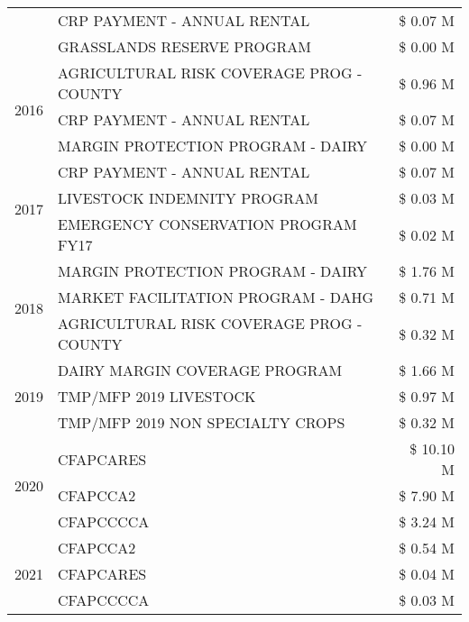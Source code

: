 \begin{tabular}{llr}
 & CRP PAYMENT - ANNUAL RENTAL & \$ 0.07 M \\
 & GRASSLANDS RESERVE PROGRAM & \$ 0.00 M \\
\cline{1-3}
\multirow[t]{3}{*}{2016} & AGRICULTURAL RISK COVERAGE PROG - COUNTY & \$ 0.96 M \\
 & CRP PAYMENT - ANNUAL RENTAL & \$ 0.07 M \\
 & MARGIN PROTECTION PROGRAM - DAIRY & \$ 0.00 M \\
\cline{1-3}
\multirow[t]{3}{*}{2017} & CRP PAYMENT - ANNUAL RENTAL & \$ 0.07 M \\
 & LIVESTOCK INDEMNITY PROGRAM & \$ 0.03 M \\
 & EMERGENCY CONSERVATION PROGRAM FY17 & \$ 0.02 M \\
\cline{1-3}
\multirow[t]{3}{*}{2018} & MARGIN PROTECTION PROGRAM - DAIRY & \$ 1.76 M \\
 & MARKET FACILITATION PROGRAM - DAHG & \$ 0.71 M \\
 & AGRICULTURAL RISK COVERAGE PROG - COUNTY & \$ 0.32 M \\
\cline{1-3}
\multirow[t]{3}{*}{2019} & DAIRY MARGIN COVERAGE PROGRAM & \$ 1.66 M \\
 & TMP/MFP 2019 LIVESTOCK & \$ 0.97 M \\
 & TMP/MFP 2019 NON SPECIALTY CROPS & \$ 0.32 M \\
\cline{1-3}
\multirow[t]{3}{*}{2020} & CFAPCARES & \$ 10.10 M \\
 & CFAPCCA2 & \$ 7.90 M \\
 & CFAPCCCCA & \$ 3.24 M \\
\cline{1-3}
\multirow[t]{3}{*}{2021} & CFAPCCA2 & \$ 0.54 M \\
 & CFAPCARES & \$ 0.04 M \\
 & CFAPCCCCA & \$ 0.03 M \\
\cline{1-3}
\bottomrule
\end{tabular}
